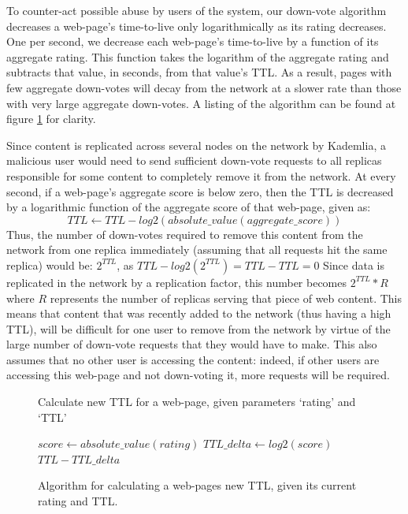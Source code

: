 To counter-act possible abuse by users of the system, our down-vote algorithm decreases a web-page's time-to-live only 
logarithmically as its rating decreases. One per second, we decrease each web-page's time-to-live by a function of its
aggregate rating. This function takes the logarithm of the aggregate rating and subtracts that value, in seconds,
from that value's TTL. As a result, pages with few aggregate down-votes will decay from the network at a slower rate than
those with very large aggregate down-votes. A listing of the algorithm can be found at figure \ref{fig:downvotealgo} for clarity.

Since content is replicated across several nodes on the network by Kademlia, a malicious user would need to send sufficient
down-vote requests to all replicas responsible for some content to completely remove it from the network.
At every second, if a web-page's aggregate score is below zero, then the TTL is decreased by a logarithmic
function of the aggregate score of that web-page, given as:
\[ TTL \leftarrow TTL - log2(absolute\_value(aggregate\_score)) \] 
Thus, the number of down-votes required to remove this content from the network from one replica immediately
(assuming that all requests hit the same replica) would be: $ 2^{TTL} $, as $ TTL - log2(2^{TTL}) = TTL - TTL = 0 $
Since data is replicated in the network by a replication factor, this number becomes $ 2^{TTL} * R $
where $R$ represents the number of replicas serving that piece of web content.
This means that content that was recently added to the network (thus having a high TTL), will be difficult for one
user to remove from the network by virtue of the large number of down-vote requests that they would have to make.
This also assumes that no other user is accessing the content: indeed, if other users are accessing this web-page and
not down-voting it, more requests will be required.

\begin{figure}
    \begin{algorithm}[H]
        \caption{Calculate new TTL for a web-page, given parameters `rating' and `TTL'}
        \begin{algorithmic}
        \ENDIF
        \STATE $ score \leftarrow absolute\_value(rating) $
        \STATE $ TTL\_delta \leftarrow log2(score) $
        \RETURN $ TTL - TTL\_delta $
        \end{algorithmic}
    \end{algorithm}
    \caption{Algorithm for calculating a web-pages new TTL, given its current rating and TTL.}
    \label{fig:downvotealgo}
\end{figure}
